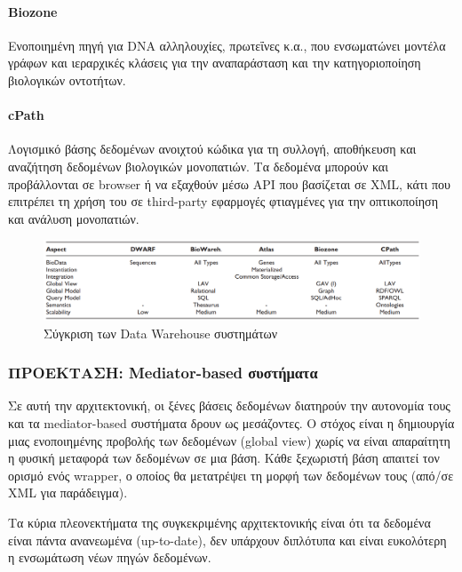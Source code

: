             \paragraph{Biozone}
                Ενοποιημένη πηγή για DNA αλληλουχίες, πρωτεΐνες κ.α., που ενσωματώνει μοντέλα γράφων και ιεραρχικές κλάσεις για την αναπαράσταση και την κατηγοριοποίηση βιολογικών οντοτήτων.

            \paragraph{cPath}
                Λογισμικό βάσης δεδομένων ανοιχτού κώδικα για τη συλλογή, αποθήκευση και αναζήτηση δεδομένων βιολογικών μονοπατιών.
                Τα δεδομένα μπορούν και προβάλλονται σε browser ή να εξαχθούν μέσω API που βασίζεται σε XML, κάτι που επιτρέπει τη χρήση του σε third-party εφαρμογές φτιαγμένες για την οπτικοποίηση και ανάλυση μονοπατιών.

            \begin{figure}[ht] \noindent\centering
                \includegraphics[scale=0.7]{img/Data warehouse table}
                \caption{Σύγκριση των Data Warehouse συστημάτων \cite{XMLbasedApproaches}}
            \end{figure}

        \subsubsection{ΠΡΟΕΚΤΑΣΗ: Mediator-based συστήματα}
            Σε αυτή την αρχιτεκτονική, οι ξένες βάσεις δεδομένων διατηρούν την αυτονομία τους και τα mediator-based συστήματα δρουν ως μεσάζοντες.
            Ο στόχος είναι η δημιουργία μιας ενοποιημένης προβολής των δεδομένων (global view) χωρίς να είναι απαραίτητη η φυσική μεταφορά των δεδομένων σε μια βάση.
            Κάθε ξεχωριστή βάση απαιτεί τον ορισμό ενός wrapper, ο οποίος θα μετατρέψει τη μορφή των δεδομένων τους (από/σε XML για παράδειγμα).

            Τα κύρια πλεονεκτήματα της συγκεκριμένης αρχιτεκτονικής είναι ότι τα δεδομένα είναι πάντα ανανεωμένα (up-to-date), δεν υπάρχουν διπλότυπα και είναι ευκολότερη η ενσωμάτωση νέων πηγών δεδομένων.

